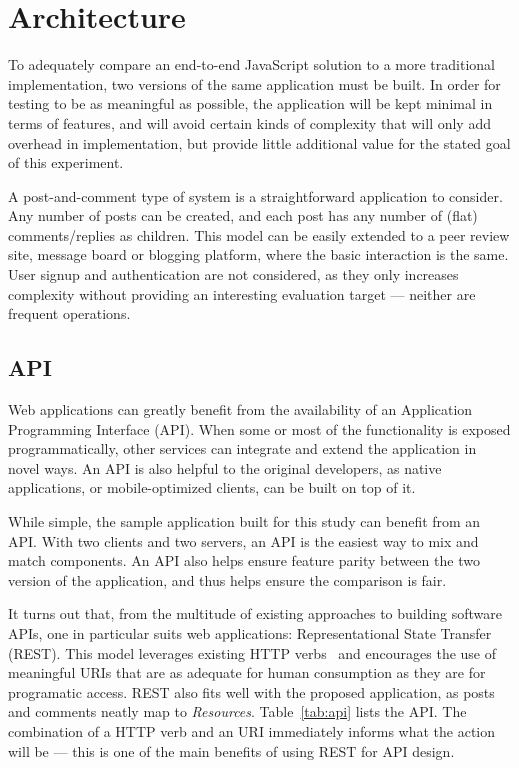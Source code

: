 \section{\label{sec:arch}Architecture}

To adequately compare an end-to-end JavaScript solution to a more traditional implementation, two versions of the same application must be built. In order for testing to be as meaningful as possible, the application will be kept minimal in terms of features, and will avoid certain kinds of complexity that will only add overhead in implementation, but provide little additional value for the stated goal of this experiment.

A post-and-comment type of system is a straightforward application to consider. Any number of posts can be created, and each post has any number of (flat) comments/replies as children. This model can be easily extended to a peer review site, message board or blogging platform, where the basic interaction is the same. User signup and authentication are not considered, as they only increases complexity without providing an interesting evaluation target --- neither are frequent operations.

\subsection{\label{sec:arch:API}API}

Web applications can greatly benefit from the availability of an Application Programming Interface (API). When some or most of the functionality is exposed programmatically, other services can integrate and extend the application in novel ways. An API is also helpful to the original developers, as native applications, or mobile-optimized clients, can be built on top of it.

While simple, the sample application built for this study can benefit from an API. With two clients and two servers, an API is the easiest way to mix and match components. An API also helps ensure feature parity between the two version of the application, and thus helps ensure the comparison is fair.

It turns out that, from the multitude of existing approaches to building software APIs, one in particular suits web applications: Representational State Transfer~\cite{restful} (REST). This model leverages existing HTTP verbs~\cite{rfc2616} and encourages the use of meaningful URIs that are as adequate for human consumption as they are for programatic access. REST also fits well with the proposed application, as posts and comments neatly map to \emph{Resources}. Table~\ref{tab:api} lists the API. The combination of a HTTP verb and an URI immediately informs what the action will be --- this is one of the main benefits of using REST for API design.


